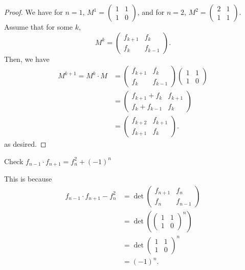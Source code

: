\documentclass[a4paper]{article}
\begin{document}
\begin{proof}
	We have for \( n=1 \), \( M^1 = \begin{pmatrix} 1& 1 \\ 1& 0 \end{pmatrix}  \), and for \( n=2 \), \( M^2=\begin{pmatrix} 2 & 1 \\ 1 & 1 \end{pmatrix}  \). Assume that for some \( k \), \[
		M^k=\begin{pmatrix} f_{k+1} & f_k \\ f_k & f_{k-1} \end{pmatrix} 
	.\] Then, we have 
	\begin{align*}
		M^{k+1} = M^k \cdot M &= \begin{pmatrix}f_{k+1} & f_k \\ f_k & f_{k-1} \end{pmatrix} \begin{pmatrix} 1 & 1 \\ 1 & 0 \end{pmatrix} \\
													&= \begin{pmatrix} f_{k+1}+f_k & f_{k+1} \\ f_k+f_{k-1} & f_k \end{pmatrix} \\
													&= \begin{pmatrix} f_{k+2} & f_{k+1} \\ f_{k+1} & f_k \end{pmatrix} 
	.\end{align*}
	as desired.
\end{proof}

\begin{remark}
	Check \( f_{n-1}\cdot f_{n+1}=f_n^2+(-1)^n \)
\end{remark}

This is because
\begin{align*}
	f_{n-1}\cdot f_{n+1} - f_n^2 &= \det \begin{pmatrix} f_{n+1} & f_n \\ f_n & f_{n-1} \end{pmatrix} \\
															 &= \det \left( \begin{pmatrix} 1 & 1 \\ 1 & 0 \end{pmatrix}^n  \right) \\
																&= \det \begin{pmatrix} 1 & 1 \\ 1 & 0 \end{pmatrix} ^n \\
																&= (-1)^n
.\end{align*}
\end{document}
